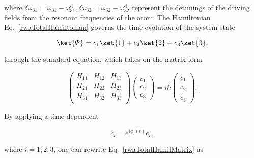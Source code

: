   \noindent                                                       where
  $   \delta\omega_{31}   =   \omega_{31}   -   \omega^{\text{d}}_{31},
  \delta\omega_{32} =  \omega_{32} -  \omega^{\text{d}}_{32}$ represent
  the detunings of the driving  fields from the resonant frequencies of
  the atom. The Hamiltonian Eq.~\eqref{rwaTotalHamiltonian} governs the
  time evolution of the system state

  \begin{equation}
    \ket{\varPsi} = c_1\ket{1}+c_2\ket{2}+c_3\ket{3},
  \end{equation}

  \noindent through the standard  \schrodinger equation, which takes on
  the matrix form

  \begin{equation}
    \begin{pmatrix}
      H_{11} & H_{12} & H_{13} \\     H_{21} & H_{22} & H_{23} \\     H_{31} & H_{32} & H_{33} \\
    \end{pmatrix}\begin{pmatrix}
      c_1\\c_2\\c_3
    \end{pmatrix}      =     i\hbar\begin{pmatrix}      \dot{c_1}     \\
      \dot{c_2}\\\dot{c_3}
    \end{pmatrix}.
    \label{rwaTotalHamilMatrix}
  \end{equation}

  \noindent   By  applying   a   time  dependent   

  \begin{equation}
    \label{eqn:InteractionTransformation}
    \widetilde{c_i} = e^{i\phi_{i}(t)}c_i,
  \end{equation}

  \noindent     where    $     i=1,2,3    $,     one    can     rewrite
  Eq.~\eqref{rwaTotalHamilMatrix} as

